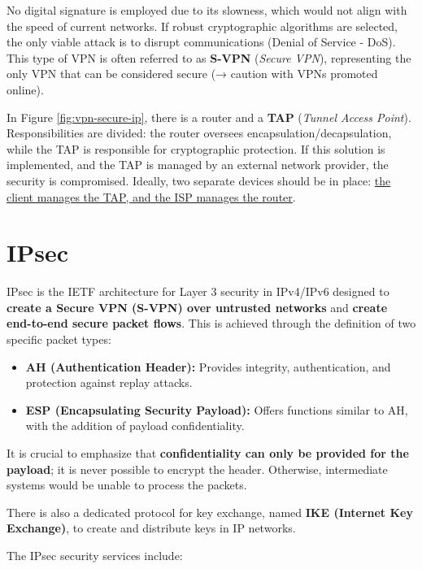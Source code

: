 No digital signature is employed due to its slowness, which would not align with the speed of current networks. If robust cryptographic algorithms are selected, the only viable attack is to disrupt communications (Denial of Service - DoS). This type of VPN is often referred to as \textbf{S-VPN} (\textit{Secure VPN}), representing the only VPN that can be considered secure (→ caution with VPNs promoted online).

In Figure \ref*{fig:vpn-secure-ip}, there is a router and a \textbf{TAP} (\textit{Tunnel Access Point}). Responsibilities are divided: the router oversees encapsulation/decapsulation, while the TAP is responsible for cryptographic protection. If this solution is implemented, and the TAP is managed by an external network provider, the security is compromised. Ideally, two separate devices should be in place: \ul{the client manages the TAP, and the ISP manages the router}.

\section{IPsec}

IPsec is the IETF architecture for Layer 3 security in IPv4/IPv6 designed to \textbf{create a Secure VPN (S-VPN) over untrusted networks} and \textbf{create end-to-end secure packet flows}. This is achieved through the definition of two specific packet types:

\begin{itemize}
	\item \textbf{AH (Authentication Header):}
	      Provides integrity, authentication, and protection against replay attacks.
	\item \textbf{ESP (Encapsulating Security Payload):}
	      Offers functions similar to AH, with the addition of payload confidentiality.
\end{itemize}

It is crucial to emphasize that \textbf{confidentiality can only be provided for the payload}; it is never possible to encrypt the header. Otherwise, intermediate systems would be unable to process the packets.

There is also a dedicated protocol for key exchange, named \textbf{IKE (Internet Key Exchange)}, to create and distribute keys in IP networks.

The IPsec security services include:

